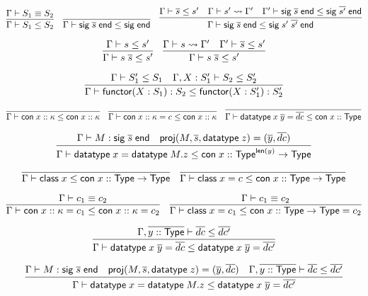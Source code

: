 \documentclass{article}
\newcommand{\mt}[1]{\mathsf{#1}}
\begin{document}
$$\infer{\Gamma \vdash S_1 \leq S_2}{
  \Gamma \vdash S_1 \equiv S_2
}
\quad \infer{\Gamma \vdash \mt{sig} \; \overline{s} \; \mt{end} \leq \mt{sig} \; \mt{end}}{}
\quad \infer{\Gamma \vdash \mt{sig} \; \overline{s} \; \mt{end} \leq \mt{sig} \; s' \; \overline{s'} \; \mt{end}}{
  \Gamma \vdash \overline{s} \leq s'
  & \Gamma \vdash s' \leadsto \Gamma'
  & \Gamma' \vdash \mt{sig} \; \overline{s} \; \mt{end} \leq \mt{sig} \; \overline{s'} \; \mt{end}
}$$

$$\infer{\Gamma \vdash s \; \overline{s} \leq s'}{
  \Gamma \vdash s \leq s'
}
\quad \infer{\Gamma \vdash s \; \overline{s} \leq s'}{
  \Gamma \vdash s \leadsto \Gamma'
  & \Gamma' \vdash \overline{s} \leq s'
}$$

$$\infer{\Gamma \vdash \mt{functor} (X : S_1) : S_2 \leq \mt{functor} (X : S'_1) : S'_2}{
  \Gamma \vdash S'_1 \leq S_1
  & \Gamma, X : S'_1 \vdash S_2 \leq S'_2
}$$

$$\infer{\Gamma \vdash \mt{con} \; x :: \kappa \leq \mt{con} \; x :: \kappa}{}
\quad \infer{\Gamma \vdash \mt{con} \; x :: \kappa = c \leq \mt{con} \; x :: \kappa}{}
\quad \infer{\Gamma \vdash \mt{datatype} \; x \; \overline{y} = \overline{dc} \leq \mt{con} \; x :: \mt{Type}}{}$$

$$\infer{\Gamma \vdash \mt{datatype} \; x = \mt{datatype} \; M.z \leq \mt{con} \; x :: \mt{Type}^{\mt{len}(y)} \to \mt{Type}}{
  \Gamma \vdash M : \mt{sig} \; \overline{s} \; \mt{end}
  & \mt{proj}(M, \overline{s}, \mt{datatype} \; z) = (\overline{y}, \overline{dc})
}$$

$$\infer{\Gamma \vdash \mt{class} \; x \leq \mt{con} \; x :: \mt{Type} \to \mt{Type}}{}
\quad \infer{\Gamma \vdash \mt{class} \; x = c \leq \mt{con} \; x :: \mt{Type} \to \mt{Type}}{}$$

$$\infer{\Gamma \vdash \mt{con} \; x :: \kappa = c_1 \leq \mt{con} \; x :: \mt{\kappa} = c_2}{
  \Gamma \vdash c_1 \equiv c_2
}
\quad \infer{\Gamma \vdash \mt{class} \; x = c_1 \leq \mt{con} \; x :: \mt{Type} \to \mt{Type} = c_2}{
  \Gamma \vdash c_1 \equiv c_2
}$$

$$\infer{\Gamma \vdash \mt{datatype} \; x \; \overline{y} = \overline{dc} \leq \mt{datatype} \; x \; \overline{y} = \overline{dc'}}{
  \Gamma, \overline{y :: \mt{Type}} \vdash \overline{dc} \leq \overline{dc'}
}$$

$$\infer{\Gamma \vdash \mt{datatype} \; x = \mt{datatype} \; M.z \leq \mt{datatype} \; x \; \overline{y} = \overline{dc'}}{
  \Gamma \vdash M : \mt{sig} \; \overline{s} \; \mt{end}
  & \mt{proj}(M, \overline{s}, \mt{datatype} \; z) = (\overline{y}, \overline{dc})
  & \Gamma, \overline{y :: \mt{Type}} \vdash \overline{dc} \leq \overline{dc'}
}$$
\end{document}
